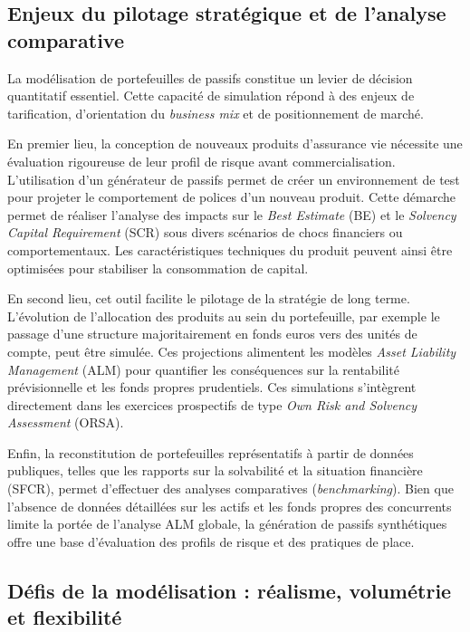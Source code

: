 \subsection{Enjeux du pilotage stratégique et de l'analyse comparative}

La modélisation de portefeuilles de passifs constitue un levier de décision quantitatif essentiel. Cette capacité de simulation répond à des enjeux de tarification, d'orientation du \textit{business mix} et de positionnement de marché.

En premier lieu, la conception de nouveaux produits d'assurance vie nécessite une évaluation rigoureuse de leur profil de risque avant commercialisation. L'utilisation d'un générateur de passifs permet de créer un environnement de test pour projeter le comportement de polices d'un nouveau produit. Cette démarche permet de réaliser l'analyse des impacts sur le \textit{Best Estimate} (BE) et le \textit{Solvency Capital Requirement} (SCR) sous divers scénarios de chocs financiers ou comportementaux. Les caractéristiques techniques du produit peuvent ainsi être optimisées pour stabiliser la consommation de capital.

En second lieu, cet outil facilite le pilotage de la stratégie de long terme. L'évolution de l'allocation des produits au sein du portefeuille, par exemple le passage d'une structure majoritairement en fonds euros vers des unités de compte, peut être simulée. Ces projections alimentent les modèles \textit{Asset Liability Management} (ALM) pour quantifier les conséquences sur la rentabilité prévisionnelle et les fonds propres prudentiels. Ces simulations s'intègrent directement dans les exercices prospectifs de type \textit{Own Risk and Solvency Assessment} (ORSA).

Enfin, la reconstitution de portefeuilles représentatifs à partir de données publiques, telles que les rapports sur la solvabilité et la situation financière (SFCR), permet d'effectuer des analyses comparatives (\textit{benchmarking}). Bien que l'absence de données détaillées sur les actifs et les fonds propres des concurrents limite la portée de l'analyse ALM globale, la génération de passifs synthétiques offre une base d'évaluation des profils de risque et des pratiques de place.

\subsection{Défis de la modélisation : réalisme, volumétrie et flexibilité}

